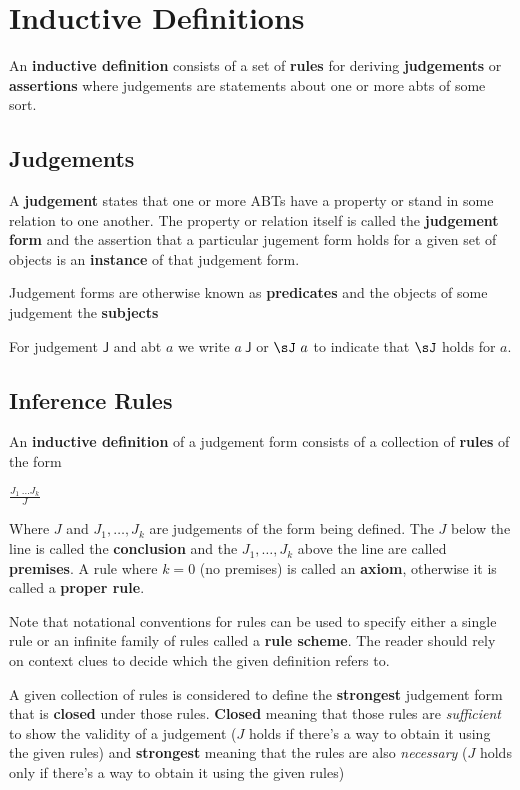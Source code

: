 \documentclass[11pt]{book}
\begin{document}
\chapter{Inductive Definitions}

An \textbf{inductive definition} consists of a set of \textbf{rules} for deriving \textbf{judgements} or \textbf{assertions} where judgements are statements about one or more abts of some sort.

\section{Judgements}

A \textbf{judgement} states that one or more ABTs have a property or stand in some relation to one another. The property or relation itself is called the \textbf{judgement form} and the assertion that a particular jugement form holds for a given set of objects is an \textbf{instance} of that judgement form.

Judgement forms are otherwise known as \textbf{predicates} and the objects of some judgement the \textbf{subjects}

For judgement $\mathsf{J}$ and abt $a$ we write $a\ \mathsf{J}$ or $\sJ\ a$ to indicate that $\sJ$ holds for $a$.

\section{Inference Rules}

An \textbf{inductive definition} of a judgement form consists of a collection of \textbf{rules} of the form

$\frac{J_1\ \dots J_k}{J}$

Where $J$ and $J_1,\dots,J_k$ are judgements of the form being defined. The $J$ below the line is called the \textbf{conclusion} and the $J_1,\dots,J_k$ above the line are called \textbf{premises}. A rule where $k=0$ (no premises) is called an \textbf{axiom}, otherwise it is called a \textbf{proper rule}.

\br

Note that notational conventions for rules can be used to specify either a single rule or an infinite family of rules called a \textbf{rule scheme}. The reader should rely on context clues to decide which the given definition refers to.

\br

A given collection of rules is considered to define the \textbf{strongest} judgement form that is \textbf{closed} under those rules. \textbf{Closed} meaning that those rules are \textit{sufficient} to show the validity of a judgement ($J$ holds if there's a way to obtain it using the given rules) and \textbf{strongest} meaning that the rules are also \textit{necessary} ($J$ holds only if there's a way to obtain it using the given rules)
\end{document}
